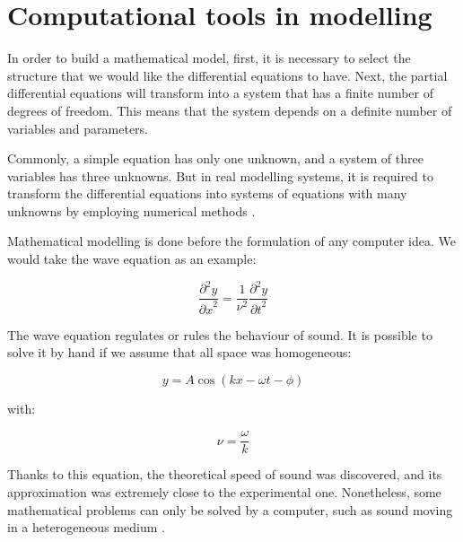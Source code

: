 \documentclass[11pt, letterpaper, english]{article}
\begin{document}
    
    
     
  
   
    
\newpage

\section{Computational tools in modelling}

\par{In order to build a mathematical model, first, it is necessary to select the structure that we would like the differential equations to have. Next, the partial differential equations will transform into a system that has a finite number of degrees of freedom. This means that the system depends on a definite number of variables and parameters.}


\par{Commonly, a simple equation has only one unknown, and a system of three variables has three unknowns. But in real modelling systems, it is required to transform the differential equations into systems of equations with many unknowns by employing numerical methods  \cite{garfinkel_shevtsov_guo_2017}.}

\par{Mathematical modelling is done before the formulation of any computer idea. We would take the wave equation as an example:}

\begin{equation}
    \frac{\partial^2 y}{{\partial x}^2}=\frac{1}{\nu^2} \frac{\partial^2 y}{{\partial t}^2}
\end{equation}

\par{The wave equation regulates or rules the behaviour of sound. It is possible to solve it by hand if we assume that all space was homogeneous: }

\begin{equation*}
    y= A \cos{ \left( k x - \omega t - \phi \right) }
\end{equation*}

\par{with:}

\begin{equation*}
    \nu = \frac{ \omega }{ k }
\end{equation*}

\par{Thanks to this equation, the theoretical speed of sound was discovered, and its approximation was extremely close to the experimental one. Nonetheless, some mathematical problems can only be solved by a computer, such as sound moving in a heterogeneous medium  \cite{garfinkel_shevtsov_guo_2017}.}
\end{document}
